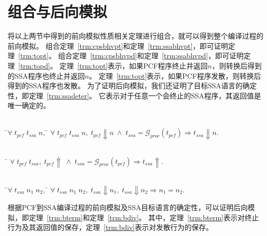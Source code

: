\section{组合与后向模拟} \label{sec:combback}

将以上两节中得到的前向模拟性质相关定理进行组合，就可以得到整个编译过程的前向模拟。
组合定理~\ref{trm:cpsbhvpt}和定理~\ref{trm:ssabhvpt}，即可证明定理~\ref{trm:topt}。
组合定理~\ref{trm:cpsbhvpd}和定理~\ref{trm:ssabhvpd}，即可证明定理~\ref{trm:topd}。
定理~\ref{trm:topt}表示，如果PCF程序终止并返回$n$，则转换后得到的SSA程序也终止并返回$n$。
定理~\ref{trm:topt}表示，如果PCF程序发散，则转换后得到的SSA程序也发散。
为了证明后向模拟，我们还证明了目标SSA语言的确定性，即定理~\ref{trm:ssadeter}。
它表示对于任意一个会终止的SSA程序，其返回值是唯一确定的。

  \begin{theorem}[SSA程序对PCF程序终止行为的保存]\label{trm:topt} 
    \begin{tabbing}
     \\
    \quad\=$\forall \; t_{pcf}\; t_{ssa}\; n,\; $\=\kill
    \>$\forall \; t_{pcf}\; t_{ssa}\; n,\; t_{pcf}\Downarrow n\; \wedge \; t_{ssa}=\mathcal{G}_{proc}(t_{pcf}) \Longrightarrow t_{ssa}\Downarrow n.$
    \end{tabbing}
  \end{theorem}
  
  \begin{theorem}[SSA程序对PCF程序发散行为的保存]\label{trm:topd}
    \begin{tabbing}
      \\
    \quad\=\kill
    \>$\forall \; t_{pcf}\; t_{ssa},\; t_{pcf}\Uparrow\; \wedge \; t_{ssa}=\mathcal{G}_{proc}(t_{pcf})\Longrightarrow t_{ssa}\Uparrow.$
    \end{tabbing}
  \end{theorem}  

  \begin{theorem}[SSA语言的确定性]\label{trm:ssadeter} 
    \begin{tabbing}
     \\
    \quad\=$\forall \; t_{ssa}\; n_1\; n_2,\; $\=\kill
    \>$\forall \; t_{ssa}\; n_1\; n_2,\; t_{ssa}\Downarrow n_1,\; t_{ssa}\Downarrow n_2 \Longrightarrow n_1 = n_2.$
    \end{tabbing}
  \end{theorem}

根据PCF到SSA编译过程的前向模拟及SSA目标语言的确定性，可以证明后向模拟，即定理~\ref{trm:bterm}和定理~\ref{trm:bdiv}。
其中，定理~\ref{trm:bterm}表示对终止行为及其返回值的保存，定理~\ref{trm:bdiv}表示对发散行为的保存。

